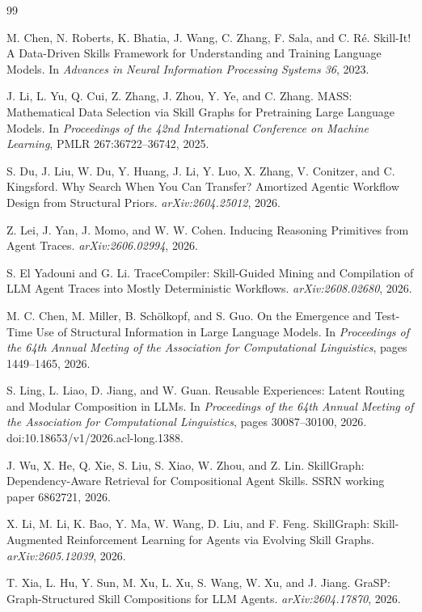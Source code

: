 \begin{thebibliography}{99}

M. Chen, N. Roberts, K. Bhatia, J. Wang, C. Zhang, F. Sala, and C. R\'e. Skill-It! A Data-Driven Skills Framework for Understanding and Training Language Models. In \emph{Advances in Neural Information Processing Systems 36}, 2023.

J. Li, L. Yu, Q. Cui, Z. Zhang, J. Zhou, Y. Ye, and C. Zhang. MASS: Mathematical Data Selection via Skill Graphs for Pretraining Large Language Models. In \emph{Proceedings of the 42nd International Conference on Machine Learning}, PMLR 267:36722--36742, 2025.

S. Du, J. Liu, W. Du, Y. Huang, J. Li, Y. Luo, X. Zhang, V. Conitzer, and C. Kingsford. Why Search When You Can Transfer? Amortized Agentic Workflow Design from Structural Priors. \emph{arXiv:2604.25012}, 2026.

Z. Lei, J. Yan, J. Momo, and W. W. Cohen. Inducing Reasoning Primitives from Agent Traces. \emph{arXiv:2606.02994}, 2026.

S. El Yadouni and G. Li. TraceCompiler: Skill-Guided Mining and Compilation of LLM Agent Traces into Mostly Deterministic Workflows. \emph{arXiv:2608.02680}, 2026.

M. C. Chen, M. Miller, B. Sch\"olkopf, and S. Guo. On the Emergence and Test-Time Use of Structural Information in Large Language Models. In \emph{Proceedings of the 64th Annual Meeting of the Association for Computational Linguistics}, pages 1449--1465, 2026.

S. Ling, L. Liao, D. Jiang, and W. Guan. Reusable Experiences: Latent Routing and Modular Composition in LLMs. In \emph{Proceedings of the 64th Annual Meeting of the Association for Computational Linguistics}, pages 30087--30100, 2026. doi:10.18653/v1/2026.acl-long.1388.

J. Wu, X. He, Q. Xie, S. Liu, S. Xiao, W. Zhou, and Z. Lin. SkillGraph: Dependency-Aware Retrieval for Compositional Agent Skills. SSRN working paper 6862721, 2026.

X. Li, M. Li, K. Bao, Y. Ma, W. Wang, D. Liu, and F. Feng. SkillGraph: Skill-Augmented Reinforcement Learning for Agents via Evolving Skill Graphs. \emph{arXiv:2605.12039}, 2026.

T. Xia, L. Hu, Y. Sun, M. Xu, L. Xu, S. Wang, W. Xu, and J. Jiang. GraSP: Graph-Structured Skill Compositions for LLM Agents. \emph{arXiv:2604.17870}, 2026.


\end{thebibliography}
